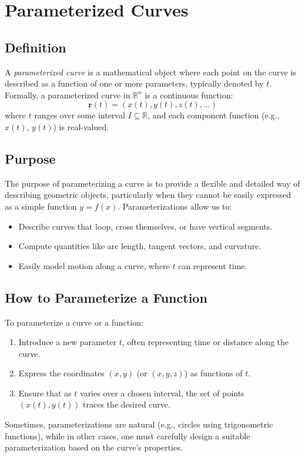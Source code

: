 \newpage
\section{Parameterized Curves}

\subsection{Definition}
A \emph{parameterized curve} is a mathematical object where each point on the curve is described as a function of one or more parameters, typically denoted by \( t \). Formally, a parameterized curve in \( \mathbb{R}^n \) is a continuous function:
\[
\mathbf{r}(t) = (x(t), y(t), z(t), \ldots)
\]
where \( t \) ranges over some interval \( I \subseteq \mathbb{R} \), and each component function (e.g., \( x(t) \), \( y(t) \)) is real-valued.

\subsection{Purpose}
The purpose of parameterizing a curve is to provide a flexible and detailed way of describing geometric objects, particularly when they cannot be easily expressed 
as a simple function \( y = f(x) \). Parameterizations allow us to:
\begin{itemize}[label=\(-\)]
    \item Describe curves that loop, cross themselves, or have vertical segments.
    \item Compute quantities like arc length, tangent vectors, and curvature.
    \item Easily model motion along a curve, where \( t \) can represent time.
\end{itemize}

\subsection{How to Parameterize a Function}
To parameterize a curve or a function:
\begin{enumerate}
    \item Introduce a new parameter \( t \), often representing time or distance along the curve.
    \item Express the coordinates \( (x, y) \) (or \( (x, y, z) \)) as functions of \( t \).
    \item Ensure that as \( t \) varies over a chosen interval, the set of points \( (x(t), y(t)) \) traces the desired curve.
\end{enumerate}
Sometimes, parameterizations are natural (e.g., circles using trigonometric functions), while in other cases, one must carefully design a suitable parameterization based on the curve's properties.
\vspace{\baselineskip}

